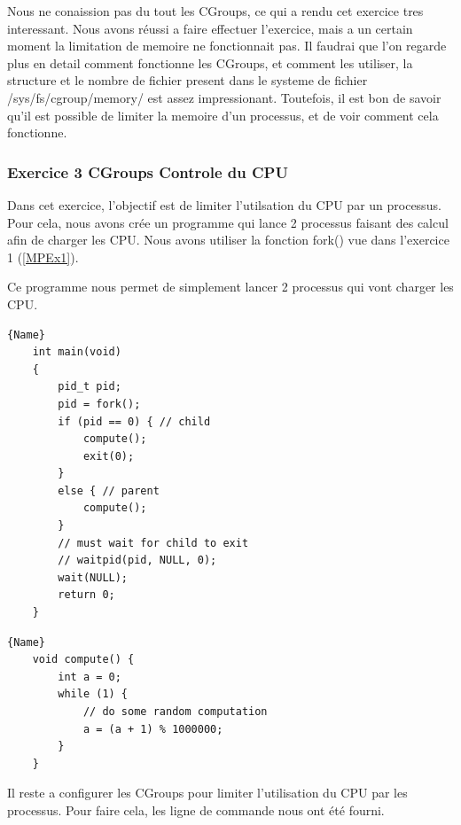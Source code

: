 \documentclass[
	a4paper, %
	10pt, %
]{CSUniSchoolLabReport}
\begin{document}

Nous ne conaission pas du tout les CGroups, ce qui a rendu cet exercice tres interessant.
Nous avons réussi a faire effectuer l'exercice, mais a un certain moment la limitation de memoire ne fonctionnait pas.
Il faudrai que l'on regarde plus en detail comment fonctionne les CGroups, et comment les utiliser, la structure et le nombre de fichier present dans le systeme de fichier /sys/fs/cgroup/memory/ est assez impressionant.
Toutefois, il est bon de savoir qu'il est possible de limiter la memoire d'un processus, et de voir comment cela fonctionne.

\subsubsection{Exercice 3 CGroups Controle du CPU}\label{MPEx3}
Dans cet exercice, l'objectif est de limiter l'utilsation du CPU par un processus.
Pour cela, nous avons crée un programme qui lance 2 processus faisant des calcul afin de charger les CPU. 
Nous avons utiliser la fonction fork() vue dans l'exercice 1 (\ref{MPEx1}).

Ce programme nous permet de simplement lancer 2 processus qui vont charger les CPU.\\
\noindent\begin{minipage}{.50\textwidth}
	\begin{lstlisting}[style=CStyle, caption=Processus Enfant, firstnumber=1]{Name}
	int main(void)
	{
		pid_t pid;
		pid = fork();
		if (pid == 0) { // child
			compute();
			exit(0);
		}
		else { // parent
			compute();
		}
		// must wait for child to exit
		// waitpid(pid, NULL, 0);
		wait(NULL);
		return 0;
	}
	\end{lstlisting}
	\end{minipage}\hfill
	\begin{minipage}{.45\textwidth}
	\begin{lstlisting}[style=CStyle, caption=Processus Parent, firstnumber=1]{Name}
	void compute() {
		int a = 0;
		while (1) {
			// do some random computation
			a = (a + 1) % 1000000;
		}
	}
	\end{lstlisting}
\end{minipage}

Il reste a configurer les CGroups pour limiter l'utilisation du CPU par les processus. Pour faire cela, les ligne de commande nous ont été fourni.
\end{document}
